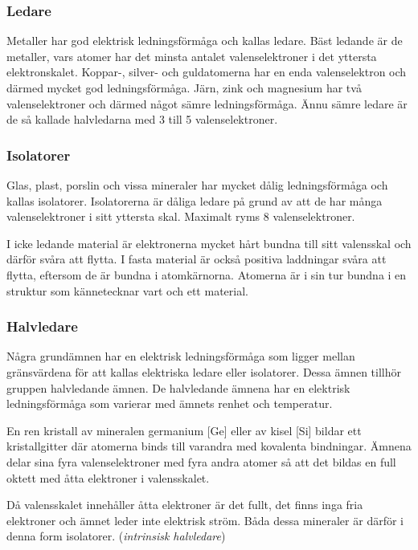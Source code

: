 \subsubsection{Ledare}

Metaller har god elektrisk ledningsförmåga och kallas ledare.
Bäst ledande är de metaller, vars atomer har det minsta antalet
valenselektroner i det yttersta elektronskalet.
Koppar-, silver- och guldatomerna har en enda valenselektron och därmed mycket
god ledningsförmåga.
Järn, zink och magnesium har två valenselektroner och därmed något sämre
ledningsförmåga.
Ännu sämre ledare är de så kallade halvledarna med 3 till 5 valenselektroner.

\subsubsection{Isolatorer}

Glas, plast, porslin och vissa mineraler har mycket dålig ledningsförmåga och
kallas isolatorer.
Isolatorerna är dåliga ledare på grund av att de har många valenselektroner i
sitt yttersta skal.
Maximalt ryms 8 valenselektroner.

I icke ledande material är elektronerna mycket hårt bundna till sitt valensskal
och därför svåra att flytta.
I fasta material är också positiva laddningar svåra att flytta, eftersom de är
bundna i atomkärnorna.
Atomerna är i sin tur bundna i en struktur som kännetecknar vart och ett
material.

\subsubsection{Halvledare}

Några grundämnen har en elektrisk ledningsförmåga som ligger mellan gränsvärdena
för att kallas elektriska ledare eller isolatorer.
Dessa ämnen tillhör gruppen halvledande ämnen.
De halvledande ämnena har en elektrisk ledningsförmåga som varierar med ämnets
renhet och temperatur.

En ren kristall av mineralen germanium [Ge] eller av kisel [Si] bildar ett
kristallgitter där atomerna binds till varandra med kovalenta bindningar.
Ämnena delar sina fyra valenselektroner med fyra andra atomer så att det
bildas en full oktett med åtta elektroner i valensskalet.

Då valensskalet innehåller åtta elektroner är det fullt, det finns inga fria
elektroner och ämnet leder inte elektrisk ström.
Båda dessa mineraler är därför i denna form isolatorer.
(\emph{intrinsisk halvledare})

